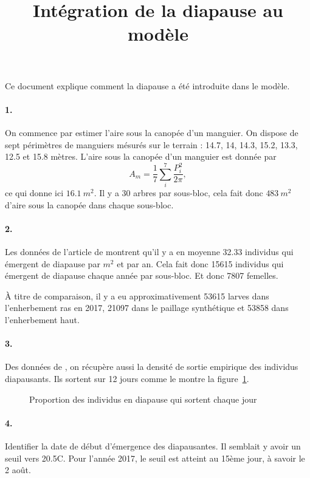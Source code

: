 \documentclass[a4paper, 11pt]{article}
\title{Intégration de la diapause au modèle}
\author{}
\date{}
\begin{document}
\maketitle

Ce document explique comment la diapause a été introduite dans le modèle.

\paragraph{1.} On commence par estimer l'aire sous la canopée d'un manguier. On dispose de sept périmètres de manguiers mésurés sur le terrain : 14.7, 14, 14.3, 15.2, 13.3, 12.5 et 15.8 mètres. L'aire sous la canopée d'un manguier est donnée par
\[
A_m = \frac{1}{7} \sum_i^7 \frac{P_i^2}{2\pi}, 
\]
ce qui donne ici $16.1 \ m^2$. Il y a 30 arbres par sous-bloc, cela fait donc $483 \ m^2$ d'aire sous la canopée dans chaque sous-bloc.

\paragraph{2.} Les données de l'article de \citet{a2014} montrent qu'il y a en moyenne 32.33 individus qui émergent de diapause par $m^2$ et par an. Cela fait donc 15615 individus qui émergent de diapause chaque année par sous-bloc. Et donc 7807 femelles.

À titre de comparaison, il y a eu approximativement 53615 larves dans l'enherbement ras en 2017, 21097 dans le paillage synthétique et 53858 dans l'enherbement haut.

\paragraph{3.} Des données de \citet{a2014}, on récupère aussi la densité de sortie empirique des individus diapausants. Ils sortent sur 12 jours comme le montre la figure~\ref{sortie}.
\begin{figure}[ht]
 \centering
 \caption{Proportion des individus en diapause qui sortent chaque jour}
 \label{sortie}
\end{figure}

\paragraph{4.} Identifier la date de début d'émergence des diapausantes. Il semblait y avoir un seuil vers 20.5\textdegree C. Pour l'année 2017, le seuil est atteint au 15ème jour, à savoir le 2 août.
\end{document}
